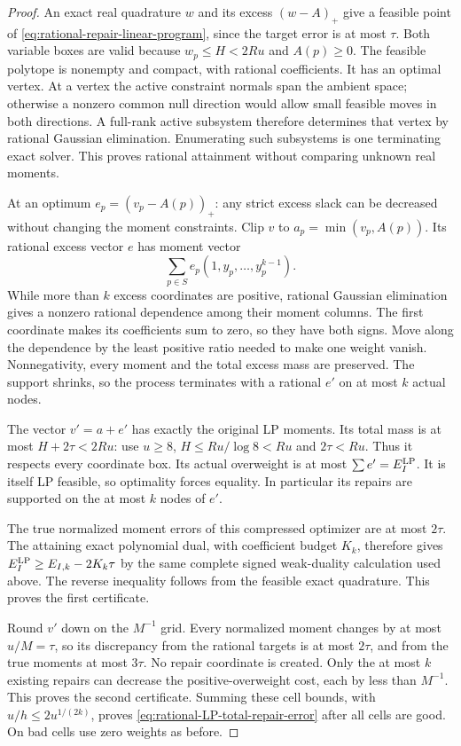 \documentclass[11pt]{article}
\theoremstyle{definition}
\begin{document}
\begin{proof}
An exact real quadrature $w$ and its excess $(w-A)_+$ give a
feasible point of \eqref{eq:rational-repair-linear-program},
since the target error is at most $\tau$.
Both variable boxes are valid because $w_p\le H<2Ru$ and
$A(p)\ge0$. The feasible polytope is nonempty and compact,
with rational coefficients. It has an optimal vertex.
At a vertex the active constraint normals span the ambient
space; otherwise a nonzero common null direction would allow
small feasible moves in both directions.
A full-rank active subsystem therefore determines that vertex
by rational Gaussian elimination. Enumerating such subsystems
is one terminating exact solver. This proves rational attainment
without comparing unknown real moments.

At an optimum $e_p=(v_p-A(p))_+$: any strict excess slack can
be decreased without changing the moment constraints.
Clip $v$ to $a_p=\min(v_p,A(p))$. Its rational excess vector
$e$ has moment vector
\[
 \sum_{p\in S}e_p(1,y_p,\ldots,y_p^{k-1}).
\]
While more than $k$ excess coordinates are positive, rational
Gaussian elimination gives a nonzero rational dependence among
their moment columns. The first coordinate makes its
coefficients sum to zero, so they have both signs.
Move along the dependence by the least positive ratio needed
to make one weight vanish. Nonnegativity, every moment and
the total excess mass are preserved. The support shrinks,
so the process terminates with a rational $e'$ on at most
$k$ actual nodes.

The vector $v'=a+e'$ has exactly the original LP moments.
Its total mass is at most $H+2\tau<2Ru$: use $u\ge8$,
$H\le Ru/\log8<Ru$ and $2\tau<Ru$.
Thus it respects every coordinate box. Its actual overweight
is at most $\sum e'=E_I^{\rm LP}$. It is itself LP feasible,
so optimality forces equality. In particular its repairs are
supported on the at most $k$ nodes of $e'$.

The true normalized moment errors of this compressed optimizer
are at most $2\tau$. The attaining exact polynomial dual,
with coefficient budget $K_k$, therefore gives
$E_I^{\rm LP}\ge E_{I,k}-2K_k\tau$ by the same complete signed
weak-duality calculation used above.
The reverse inequality follows from the feasible exact
quadrature. This proves the first certificate.

Round $v'$ down on the $M^{-1}$ grid.
Every normalized moment changes by at most $u/M=\tau$,
so its discrepancy from the rational targets is at most
$2\tau$, and from the true moments at most $3\tau$.
No repair coordinate is created. Only the at most $k$
existing repairs can decrease the positive-overweight cost,
each by less than $M^{-1}$. This proves the second certificate.
Summing these cell bounds, with $u/h\le2u^{1/(2k)}$,
proves \eqref{eq:rational-LP-total-repair-error} after all cells
are good. On bad cells use zero weights as before.


\end{proof}
\end{document}
